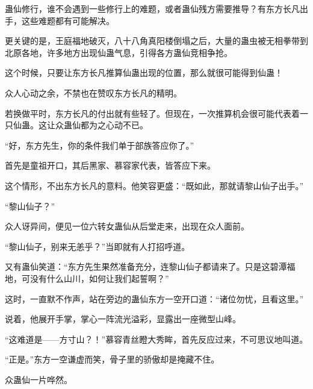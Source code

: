 \begin{this_body}
蛊仙修行，谁不会遇到一些修行上的难题，或者蛊仙残方需要推导？有东方长凡出手，这些难题都有可能解决。

更关键的是，王庭福地破灭，八十八角真阳楼倒塌之后，大量的蛊虫被无相拳带到北原各地，许多地方出现仙蛊气息，引得各方蛊仙竞相争抢。

这个时候，只要让东方长凡推算仙蛊出现的位置，那么就很可能得到仙蛊！

众人心动之余，不禁也在赞叹东方长凡的精明。

若换做平时，东方长凡的付出就有些轻了。但现在，一次推算机会很可能代表着一只仙蛊。这让众蛊仙都为之心动不已。

“好，东方先生，你的条件我们单于部族答应你了。”

首先是童祖开口，其后黑家、慕容家代表，皆答应下来。

这个情形，不出东方长凡的意料。他笑容更盛：“既如此，那就请黎山仙子出手。”

“黎山仙子？”

众人讶异间，便见一位六转女蛊仙从后堂走来，出现在众人面前。

“黎山仙子，别来无恙乎？”当即就有人打招呼道。

又有蛊仙笑道：“东方先生果然准备充分，连黎山仙子都请来了。只是这碧潭福地，可没有什么山川，如何让我们起誓啊？”

这时，一直默不作声，站在旁边的蛊仙东方一空开口道：“诸位勿忧，且看这里。”

说着，他展开手掌，掌心一阵流光溢彩，显露出一座微型山峰。

“这难道是——方寸山？！”慕容青丝瞪大秀眸，首先反应过来，不可思议地叫道。

“正是。”东方一空谦虚而笑，骨子里的骄傲却是掩藏不住。

众蛊仙一片哗然。

\end{this_body}

